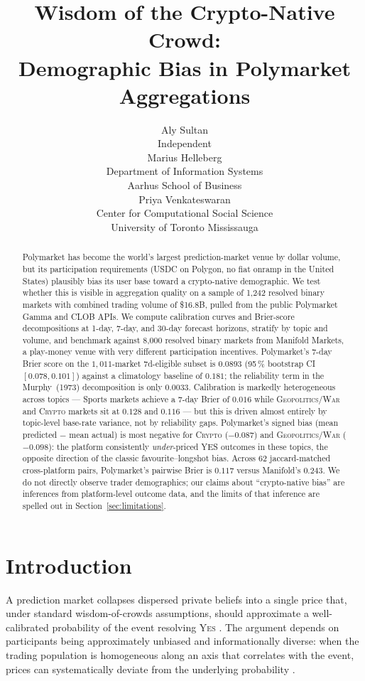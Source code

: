 \documentclass{article}
\title{Wisdom of the Crypto-Native Crowd: \\
       Demographic Bias in Polymarket Aggregations}
\author{%
  Aly Sultan \\
  Independent \\
  \And
  Marius Helleberg \\
  Department of Information Systems \\
  Aarhus School of Business \\
  \And
  Priya Venkateswaran \\
  Center for Computational Social Science \\
  University of Toronto Mississauga
}
\begin{document}
\maketitle

\begin{abstract}
Polymarket has become the world's largest prediction-market venue by dollar
volume, but its participation requirements (USDC on Polygon, no fiat onramp
in the United States) plausibly bias its user base toward a crypto-native
demographic. We test whether this is visible in aggregation quality on a
sample of 1,242 resolved binary markets with combined trading volume of
\$16.8B, pulled from the public Polymarket Gamma and CLOB APIs. We compute
calibration curves and Brier-score decompositions at 1-day, 7-day, and
30-day forecast horizons, stratify by topic and volume, and benchmark
against 8,000 resolved binary markets from Manifold Markets, a play-money
venue with very different participation incentives. Polymarket's 7-day
Brier score on the $1{,}011$-market 7d-eligible subset is $0.0893$
(95\,\% bootstrap CI $[0.078, 0.101]$) against a climatology baseline
of $0.181$; the reliability term in the Murphy~(1973) decomposition is
only $0.0033$.
Calibration is markedly heterogeneous across topics --- Sports markets
achieve a 7-day Brier of $0.016$ while \textsc{Geopolitics/War} and
\textsc{Crypto} markets sit at $0.128$ and $0.116$ --- but this is driven
almost entirely by topic-level base-rate variance, not by reliability
gaps. Polymarket's signed bias (mean predicted $-$ mean actual) is most
negative for \textsc{Crypto} ($-0.087$) and \textsc{Geopolitics/War}
($-0.098$): the platform consistently \emph{under}-priced YES outcomes
in these topics, the opposite direction of the classic
favourite--longshot bias. Across 62 jaccard-matched cross-platform pairs,
Polymarket's pairwise Brier is $0.117$ versus Manifold's $0.243$. We do
not directly observe trader demographics; our claims about
``crypto-native bias'' are inferences from platform-level outcome data,
and the limits of that inference are spelled out in
Section~\ref{sec:limitations}.
\end{abstract}

\section{Introduction}

A prediction market collapses dispersed private beliefs into a single
price that, under standard wisdom-of-crowds assumptions, should
approximate a well-calibrated probability of the event resolving
\textsc{Yes} \citep{wolfers2004prediction,manski2006interpreting}. The
argument depends on participants being approximately unbiased and
informationally diverse: when the trading population is homogeneous along
an axis that correlates with the event, prices can systematically deviate
from the underlying probability
\citep{rothschild2009forecasting,snowberg2010explaining,page2013calibrated}.
\end{document}
